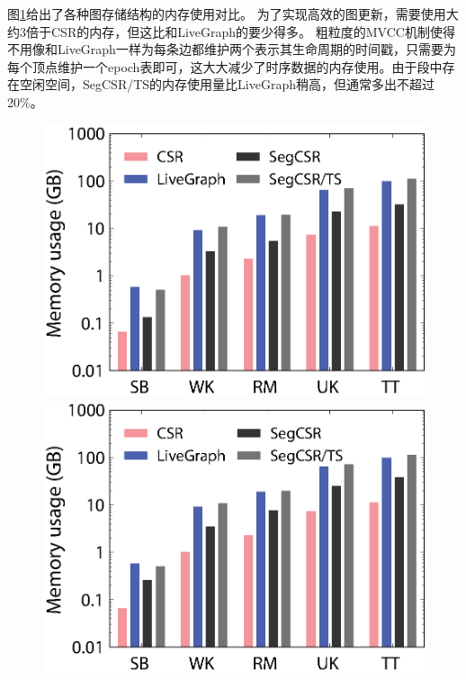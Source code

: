 图\ref{mem}给出了各种图存储结构的内存使用对比。
为了实现高效的图更新，\newstore 需要使用大约3倍于CSR的内存，但这比\store 和LiveGraph的要少得多。
粗粒度的MVCC机制使得\newstore 不用像\store 和LiveGraph一样为每条边都维护两个表示其生命周期的时间戳，只需要为每个顶点维护一个epoch表即可，这大大减少了时序数据的内存使用。由于段中存在空闲空间，SegCSR/TS的内存使用量比LiveGraph稍高，但通常多出不超过20\%。

\begin{figure}[!hpt]
\centering
\begin{minipage}{.45\linewidth}
\centering\includegraphics[scale=0.55]{figures/mem-seq.eps}
\end{minipage}
\begin{minipage}{.45\linewidth}
\centering\includegraphics[scale=0.55]{figures/mem-ran.eps}
\end{minipage} \\[10pt]
\begin{minipage}{1\linewidth}
\label{mem}
\end{minipage} \\[-10pt]
\end{figure}

